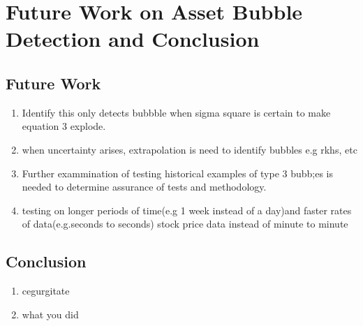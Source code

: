 \chapter{Future Work on Asset Bubble Detection and Conclusion}
\section{Future Work}
\begin{enumerate}
  \item Identify this only detects bubbble when sigma square is certain to make equation 3 explode.
  \item when uncertainty arises, extrapolation is need to identify bubbles e.g rkhs, etc\cite{bigBubble,YAFEAISMB}
  \item Further exammination of testing historical examples of type 3 bubb;es is needed to determine assurance of tests and methodology.
  \item testing on longer periods of time(e.g 1 week instead of a day)and faster rates of data(e.g.seconds to seconds)
  stock price data instead of minute to minute \cite{bigBubble}
\end{enumerate}
\section{Conclusion}
\begin{enumerate}
  \item cegurgitate
  \item what you did
\end{enumerate}